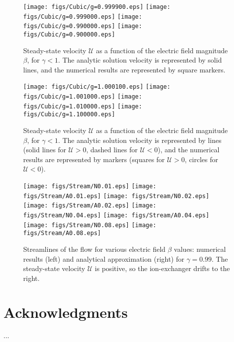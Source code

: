 \documentclass[10pt]{ijnam}
\newcommand\cU{\mathscr{U}}
\begin{document}
\begin{figure}[htbp]
    \begin{center}
    \texttt{[image: figs/Cubic/g=0.999900.eps]}
    \texttt{[image: figs/Cubic/g=0.999000.eps]}
    \texttt{[image: figs/Cubic/g=0.990000.eps]}
    \texttt{[image: figs/Cubic/g=0.900000.eps]}
        \caption{Steady-state velocity $\cU$ as a function of the 
        electric field magnitude $\beta$, for $\gamma < 1$. 
        The analytic solution velocity is represented by solid lines, 
        and the numerical results are represented by square markers.}
	    \label{fig:Cubic1}
    \end{center}
\end{figure}
\begin{figure}[htbp]
    \begin{center}
    \texttt{[image: figs/Cubic/g=1.000100.eps]}
    \texttt{[image: figs/Cubic/g=1.001000.eps]}
    \texttt{[image: figs/Cubic/g=1.010000.eps]}
    \texttt{[image: figs/Cubic/g=1.100000.eps]}
        \caption{Steady-state velocity $\cU$ as a function of the 
        electric field magnitude $\beta$, for $\gamma < 1$. 
        The analytic solution velocity is represented by lines 
        (solid lines for $\cU > 0$, dashed lines for $\cU < 0$), 
        and the numerical results are represented by markers 
        (squares for $\cU > 0$, circles for $\cU < 0$).}
	    \label{fig:Cubic2}
    \end{center}
\end{figure}
\begin{figure}[htbp]
    \begin{center}
	\texttt{[image: figs/Stream/N0.01.eps]}
	\texttt{[image: figs/Stream/A0.01.eps]}
	\texttt{[image: figs/Stream/N0.02.eps]}
	\texttt{[image: figs/Stream/A0.02.eps]}
	\texttt{[image: figs/Stream/N0.04.eps]}
	\texttt{[image: figs/Stream/A0.04.eps]}
	\texttt{[image: figs/Stream/N0.08.eps]}
	\texttt{[image: figs/Stream/A0.08.eps]}
        \caption{Streamlines of the flow for various electric field $\beta$ values: 
        numerical results (left) and analytical approximation (right) for 
        $\gamma = 0.99$.  The steady-state velocity $\cU$ is positive, so the
        ion-exchanger drifts to the right. 
        }
    \label{fig:Vortex}
    \end{center}
\end{figure}

\section*{Acknowledgments}
...



\end{document}
